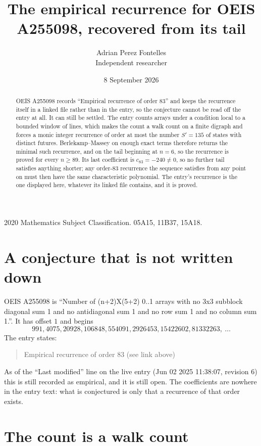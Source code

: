 \documentclass[11pt,a4paper]{article}
\title{The empirical recurrence for OEIS A255098, recovered from its tail}
\author{Adrian Perez Fontelles\\ \small Independent researcher}
\date{8 September 2026}
\theoremstyle{plain}
\theoremstyle{definition}
\begin{document}
\maketitle

\begin{abstract}
OEIS A255098 records ``Empirical recurrence of order $83$'' and keeps the recurrence itself in
a linked file rather than in the entry, so the conjecture cannot be read off the entry at all.
It can still be settled. The entry counts arrays under a condition local to a bounded window of
lines, which makes the count a walk count on a finite digraph and forces a monic integer
recurrence of order at most the number $S'=135$ of states with distinct futures. Berlekamp--Massey on
enough exact terms therefore returns the minimal such recurrence, and on the tail beginning at $n=6$, so the recurrence is proved for every $n\ge89$.
Its last coefficient is $c_{83}=-240\neq0$, so no further tail satisfies anything
shorter; any order-$83$ recurrence the sequence satisfies from any point on must then have
the same characteristic polynomial. The entry's recurrence is the one displayed here, whatever
its linked file contains, and it is proved.
\end{abstract}

\noindent\small 2020 Mathematics Subject Classification. 05A15, 11B37, 15A18.\normalsize

\section{A conjecture that is not written down}

OEIS A255098 is ``Number of (n+2)X(5+2) 0..1 arrays with no 3x3 subblock diagonal sum 1 and no antidiagonal sum 1 and no row sum 1 and no column sum 1.''. It has offset $1$ and begins
\[
991, 4075, 20928, 106848, 554091, 2926453, 15422602, 81332263,\ \dots
\]
The entry states:
\begin{quote}
Empirical recurrence of order 83 (see link above)
\end{quote}
As of the ``Last modified'' line on the live entry (Jun 02 2025 11:38:07, revision 6)
this is still recorded as empirical, and it is still open. The coefficients are nowhere in the
entry text: what is conjectured is only that a recurrence of that order exists.

\section{The count is a walk count}
\end{document}
